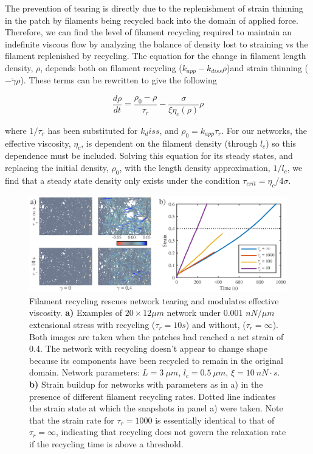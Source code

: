 \documentclass[10pt,letterpaper]{article}
\begin{document}
The prevention of tearing is directly due to the replenishment of strain thinning in the patch by filaments being recycled back into the domain of applied force.  Therefore, we can find the level of filament recycling required to maintain an indefinite viscous flow by analyzing the balance of density lost to straining vs the filament replenished by recycling.  The equation for the change in filament length density, $\rho$, depends both on filament recycling ($k_{app}-k_{diss}\rho$)and strain thinning ($-\dot{\gamma}\rho$).  These terms can be rewritten to give the following 

\begin{equation}
\frac{d \rho}{dt} = \frac{\rho_0-\rho}{\tau_r}  - \frac{\sigma}{\xi \eta_c(\rho)} \rho
\end{equation}

where $1/\tau_r$ has been substituted for $k_diss$, and $\rho_0 = k_{app}\tau_r$. For our networks, the effective viscosity, $\eta_c$, is dependent on the filament density (through $l_c$) so this dependence must be included. Solving this equation for its steady states, and replacing the initial density, $\rho_0$, with the length density approximation, $1/l_c$, we find that a steady state density only exists under the condition $\tau_{crit}=\eta_c/4\sigma$.  

\begin{figure}[h!]
\centering
\includegraphics[width=\hsize]{figures/figure5a}
\caption{\label{fig:passive_rec}  Filament recycling rescues network tearing and modulates effective viscosity.  \textbf{a)} Examples of $20 \times 12 \mu m$ network under 0.001 $nN/\mu m$ extensional stress with recycling ($\tau_r=10 s$) and without, ($\tau_r=\infty$).  Both images are taken when the patches had reached a net strain of 0.4.  The network with recycling doesn't appear to change shape because its components have been recycled to remain in the original domain.  Network parameters: $L=3\: \mu m$, $l_c=0.5\: \mu m$, $\xi=10\: nN\cdot s$.  \textbf{b)}  Strain buildup for networks with parameters as in a) in the presence of different filament recycling rates. Dotted line indicates the strain state at which the snapshots in panel a) were taken.  Note that the strain rate for $\tau_r=1000$ is essentially identical to that of $\tau_r=\infty$, indicating that recycling does not govern the relaxation rate if the recycling time is above a threshold.}
\end{figure}
\end{document}
